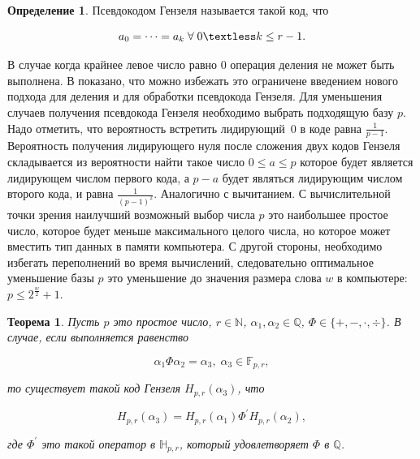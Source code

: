 \documentclass[master, och, diploma, times]{sty/SCWorks}
\theoremstyle{plain}
\newtheorem{thethm}{Теорема}[section]
\theoremstyle{definition}
\newtheorem{defn}{Определение}[section]
\begin{document}
\begin{defn}
Псевдокодом Гензеля называется такой код, что 

\begin{equation}
a_0=\dots=a_k \; \forall \; 0 \textless k \leq r-1.
\end{equation}

\end{defn}

В случае когда крайнее левое число равно $0$ операция деления не может быть выполнена. В \cite{bib:numbers:limongelli} показано, что можно избежать это ограничене \mbox{введением} нового подхода для деления и для обработки псевдокода \mbox{Гензеля}.
Для уменьшения случаев получения псевдокода Гензеля \mbox{необходимо} выбрать подходящую базу $p$. Надо отметить, что вероятность встретить \mbox{лидирующий $0$} в коде равна $\frac{1}{p-1}$. Вероятность получения лидирующего нуля после \mbox{сложения} двух кодов Гензеля складывается из вероятности найти такое число $0 \leq a \leq p$ которое будет является лидирующем числом первого кода, а $p-a$ будет являться лидирующим числом второго кода, и равна $\frac{1}{{(p-1)}^{2}}$. Аналогично с вычитанием. С вычислительной точки зрения наилучший возможный выбор числа $p$ это наибольшее простое число, которое будет меньше максимального целого числа, но которое может вместить  тип данных в памяти компьютера. С другой стороны, необходимо избегать переполнений во время вычислений, следовательно оптимальное уменьшение базы $p$ это уменьшение до значения размера слова $w$ в компьютере: $p \leq 2^\frac{w}{2}+1$.

\begin{thethm}\label{th:hensel}
Пусть $p$ это простое число, $r \in \mathbb{N}$, $\alpha_1, \alpha_2 \in \mathbb{Q}$, $\Phi \in \{+, -, \cdot , \div \}$. В случае, если выполняется равенство

\begin{equation}
\alpha_1\Phi \alpha_2 = \alpha_3, \; \alpha_3 \in \mathbb{F}_{p,r},
\end{equation}

\noindent то существует такой код Гензеля $H_{p,r}(\alpha_3)$, что

\begin{equation}
H_{p,r}(\alpha_3)=H_{p,r}(\alpha_1)\Phi^{'}H_{p,r}(\alpha_2),
\end{equation}

\noindent где $\Phi^{'}$ это такой оператор в $\mathbb{H}_{p,r}$, который удовлетворяет $\Phi$ в $\mathbb{Q}$.

\end{thethm}
\end{document}
